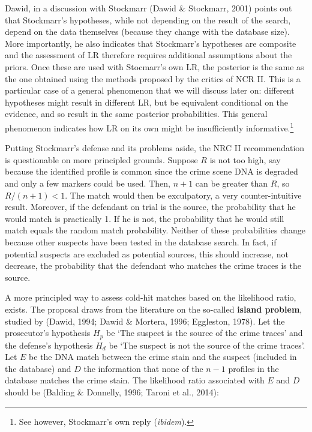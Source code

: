 \documentclass[10pt,dvipsnames,enabledeprecatedfontcommands]{scrartcl}
\begin{document}
Dawid, in a discussion with Stockmarr (Dawid \& Stockmarr, 2001) points
out that Stockmarr's hypotheses, while not depending on the result of
the search, depend on the data themselves (because they change with the
database size). More importantly, he also indicates that Stockmarr's
hypotheses are composite and the assessment of LR therefore requires
additional assumptions about the priors. Once these are used with
Stocmarr's own LR, the posterior is the same as the one obtained using
the methods proposed by the critics of NCR II. This is a particular case
of a general phenomenon that we will discuss later on: different
hypotheses might result in different LR, but be equivalent conditional
on the evidence, and so result in the same posterior probabilities. This
general phenomenon indicates how LR on its own might be insufficiently
informative.\footnote{See however, Stockmarr's own reply
  (\emph{ibidem}).}

Putting Stockmarr's defense and its problems aside, the NRC II
recommendation is questionable on more principled grounds. Suppose \(R\)
is not too high, say because the identified profile is common since the
crime scene DNA is degraded and only a few markers could be used. Then,
\(n+1\) can be greater than \(R\), so \(R/(n+1)<1\). The match would
then be exculpatory, a very counter-intuitive result. Moreover, if the
defendant on trial is the source, the probability that he would match is
practically 1. If he is not, the probability that he would still match
equals the random match probability. Neither of these probabilities
change because other suspects have been tested in the database search.
In fact, if potential suspects are excluded as potential sources, this
should increase, not decrease, the probability that the defendant who
matches the crime traces is the source.

A more principled way to assess cold-hit matches based on the likelihood
ratio, exists. The proposal draws from the literature on the so-called
\textbf{island problem}, studied by (Dawid, 1994; Dawid \& Mortera,
1996; Eggleston, 1978). Let the prosecutor's hypothesis \(H_p\) be `The
suspect is the source of the crime traces' and the defense's hypothesis
\(H_d\) be `The suspect is not the source of the crime traces'. Let
\(E\) be the DNA match between the crime stain and the suspect (included
in the database) and \(D\) the information that none of the \(n-1\)
profiles in the database matches the crime stain. The likelihood ratio
associated with \(E\) and \(D\) should be (Balding \& Donnelly, 1996;
Taroni et al., 2014):
\end{document}
